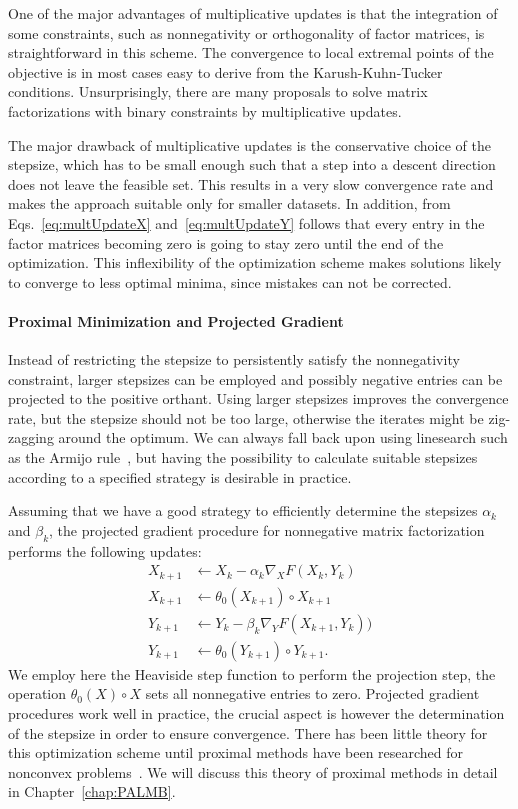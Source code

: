 One of the major advantages of multiplicative updates is that the integration of some constraints, such as nonnegativity or orthogonality of factor matrices, is straightforward in this scheme. The  convergence to local extremal points of the objective is in most cases easy to derive from the Karush-Kuhn-Tucker conditions. Unsurprisingly, there are many proposals to solve matrix factorizations with binary constraints by multiplicative updates.  

The major drawback of multiplicative updates is the conservative choice of the stepsize, which has to be small enough such that a step into a descent direction does not leave the feasible set. This results in a very slow convergence rate and makes the approach suitable only for smaller datasets. In addition, from Eqs.~\eqref{eq:multUpdateX} and~\eqref{eq:multUpdateY} follows that every entry in the factor matrices becoming zero is going to stay zero until the end of the optimization. This inflexibility of the optimization scheme makes solutions likely to converge to less optimal minima, since mistakes can not be corrected. 
%
\paragraph{Proximal Minimization and Projected Gradient}
Instead of restricting the stepsize to persistently satisfy the nonnegativity constraint, larger stepsizes can be employed and possibly negative entries can be projected to the positive orthant. Using larger stepsizes improves the convergence rate, but the stepsize should not be too large, otherwise the iterates might be zig-zagging around the optimum. We can always fall back upon using linesearch such as the Armijo rule~\citep{lin2007projected}, but having the possibility to calculate suitable stepsizes according to a specified strategy is desirable in practice.  

Assuming that we have a good strategy to efficiently determine the stepsizes $\alpha_k$ and $\beta_k$, the projected gradient procedure for nonnegative matrix factorization performs the following updates:
\begin{align*}
X_{k+1}&\gets X_k-\alpha_k\nabla_XF(X_k,Y_k) \\
X_{k+1}&\gets \theta_0(X_{k+1})\circ X_{k+1}\\
Y_{k+1}&\gets Y_k-\beta_k\nabla_YF(X_{k+1},Y_k))\\
Y_{k+1}&\gets \theta_0(Y_{k+1})\circ Y_{k+1}.
\end{align*}
We employ here the Heaviside step function to perform the projection step, the operation $\theta_0(X)\circ X$ sets all nonnegative entries to zero. Projected gradient procedures work well in practice, the crucial aspect is however the determination of the stepsize in order to ensure convergence. There has been little theory for this optimization scheme until proximal methods have been researched for nonconvex problems~\cite{bolte2014proximal}. We will discuss this theory of proximal methods in detail in Chapter~\ref{chap:PALMB}.


